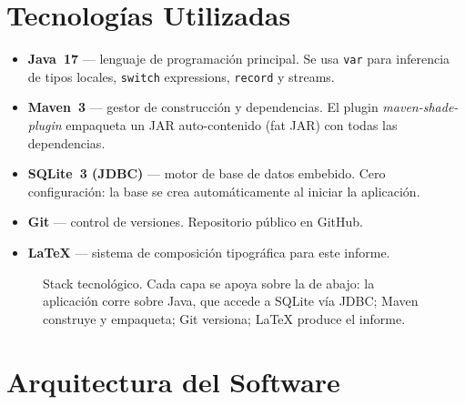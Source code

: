\documentclass[12pt,a4paper]{article}
\begin{document}
\section{Tecnologías Utilizadas}

\begin{itemize}
    \item \textbf{Java~17} --- lenguaje de programación principal. Se usa
        \texttt{var} para inferencia de tipos locales, \texttt{switch}
        expressions, \texttt{record} y streams.
    \item \textbf{Maven~3} --- gestor de construcción y dependencias. El
        plugin \emph{maven-shade-plugin} empaqueta un JAR auto-contenido
        (fat JAR) con todas las dependencias.
    \item \textbf{SQLite~3 (JDBC)} --- motor de base de datos embebido.
        Cero configuración: la base se crea automáticamente al iniciar la
        aplicación.
    \item \textbf{Git} --- control de versiones. Repositorio público en
        GitHub.
    \item \textbf{\LaTeX{}} --- sistema de composición tipográfica para
        este informe.
\end{itemize}

\begin{figure}[h]
    \centering
    \caption{Stack tecnológico. Cada capa se apoya sobre la de abajo: la
    aplicación corre sobre Java, que accede a SQLite vía JDBC; Maven
    construye y empaqueta; Git versiona; \LaTeX{} produce el informe.}
\end{figure}

\section{Arquitectura del Software}
\end{document}
